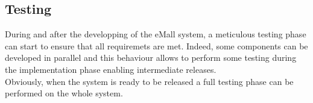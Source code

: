 \subsection{Testing}
During and after the developping of the eMall system, a meticulous testing phase can start to ensure that all requiremets are met.
Indeed, some components can be developed in parallel and this behaviour allows to perform some testing during the implementation phase enabling intermediate releases.\\
Obviously, when the system is ready to be released a full testing phase can be performed on the whole system. 